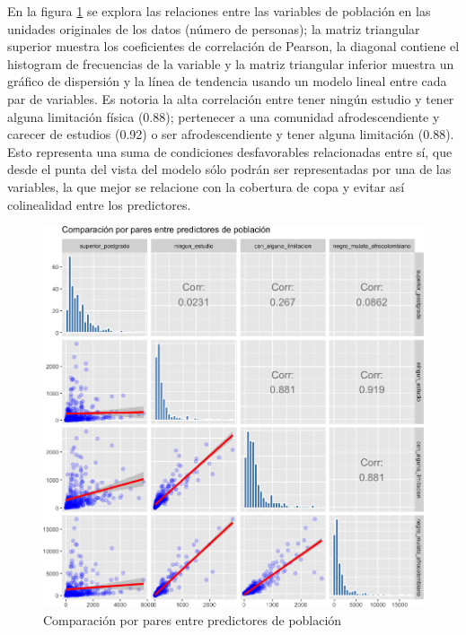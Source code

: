 \documentclass[12pt,]{book}
\begin{document}
En la figura \ref{fig:bivar-poblacion-abs} se explora las relaciones
entre las variables de población en las unidades originales de los datos
(número de personas); la matriz triangular superior muestra los
coeficientes de correlación de Pearson, la diagonal contiene el
histogram de frecuencias de la variable y la matriz triangular inferior
muestra un gráfico de dispersión y la línea de tendencia usando un
modelo lineal entre cada par de variables. Es notoria la alta
correlación entre tener ningún estudio y tener alguna limitación física
(0.88); pertenecer a una comunidad afrodescendiente y carecer de
estudios (0.92) o ser afrodescendiente y tener alguna limitación (0.88).
Esto representa una suma de condiciones desfavorables relacionadas entre
sí, que desde el punta del vista del modelo sólo podrán ser
representadas por una de las variables, la que mejor se relacione con la
cobertura de copa y evitar así colinealidad entre los predictores.

\begin{figure}
\includegraphics[width=1\linewidth]{tesis-unigis_files/figure-latex/bivar-poblacion-abs-1} \caption{Comparación por pares entre predictores de población}\label{fig:bivar-poblacion-abs}
\end{figure}
\end{document}
